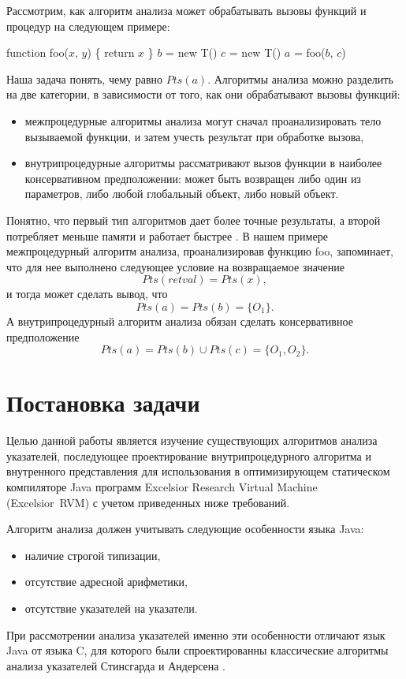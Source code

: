 \documentclass[14pt,titlepage]{extarticle}
\newcommand{\eng}[1]{{\English#1}}
\begin{document}
    Рассмотрим, как алгоритм анализа может обрабатывать вызовы
    функций и процедур на следующем примере:
    \begin{algorithmic}[1]
    \STATE function foo($x$, $y$) \{ return $x$ \}
    \STATE $b$ = new T()
    \STATE $c$ = new T()
    \STATE $a$ = foo($b$, $c$)
    \end{algorithmic}
    Наша задача понять, чему равно $Pts(a)$.
    Алгоритмы анализа можно разделить на две категории, в зависимости от того,
    как они обрабатывают вызовы функций:
    \begin{itemize}
      \item межпроцедурные алгоритмы анализа могут сначал проанализировать
            тело вызываемой функции, и затем учесть результат при обработке
            вызова,
      \item внутрипроцедурные алгоритмы рассматривают вызов функции в наиболее
            консервативном предположении: может быть возвращен либо один из
            параметров, либо любой глобальный объект, либо новый объект.
    \end{itemize}
    Понятно, что первый тип алгоритмов дает более точные результаты,
    а второй потребляет меньше памяти и работает быстрее
    \cite[с.~117]{andersen}.
    В нашем примере межпроцедурный алгоритм анализа, проанализировав функцию
    foo, запоминает, что для нее выполнено следующее условие на возвращаемое
    значение
    \[Pts(retval) = Pts(x),\]
    и тогда может сделать вывод, что \[Pts(a) = Pts(b) = \{O_1\}.\]
    А внутрипроцедурный алгоритм анализа обязан сделать консервативное
    предположение \[Pts(a) = Pts(b) \cup Pts(c) = \{O_1, O_2\}.\]


  \newpage
  \section{Постановка задачи}

    Целью данной работы является изучение существующих алгоритмов анализа
    указателей, последующее проектирование внутрипроцедурного алгоритма и
    внутренного представления для использования в оптимизирующем
    статическом компиляторе Java программ
    \eng{Excelsior Research Virtual Machine (Excelsior~RVM)}
    с учетом приведенных ниже требований.

    Алгоритм анализа должен учитывать следующие особенности языка Java:
    \begin{itemize}
      \item наличие строгой типизации,
      \item отсутствие адресной арифметики,
      \item отсутствие указателей на указатели.
    \end{itemize}
    При рассмотрении анализа указателей
    именно эти особенности отличают язык Java от языка C, для которого были
    спроектированны классические алгоритмы анализа указателей
    Стинсгарда \cite{steensgaard} и Андерсена \cite{andersen}.
\end{document}
